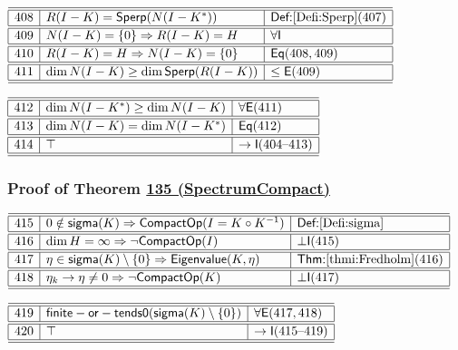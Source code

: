 \documentclass[11pt,reqno]{amsart}
\begin{document}
\medskip

\noindent$%
\begin{array}{|r|l|l|}
\hline\hline
408 & R(I-K)=\mathsf{Sperp}(N(I-K^{*})) & \textsf{Def:}\ref{Defi:Sperp}(407) \\ \hline\hline
409 & N(I-K)=\{0\}\Rightarrow R(I-K)=H & \forall\mathsf{I} \\ \hline\hline
410 & R(I-K)=H\Rightarrow N(I-K)=\{0\} & \mathsf{Eq}(408,409) \\ \hline\hline
411 & \dim N(I-K)\ge\dim\mathsf{Sperp}(R(I-K)) & \le\mathsf{E}(409) \\ \hline\hline
\end{array}%
$

\medskip

\noindent$%
\begin{array}{|r|l|l|}
\hline\hline
412 & \dim N(I-K^{*})\ge\dim N(I-K) & \forall\mathsf{E}(411) \\ \hline\hline
413 & \dim N(I-K)=\dim N(I-K^{*}) & \mathsf{Eq}(412) \\ \hline\hline
414 & \top & \to\mathsf{I}(404\text{--}413) \\ \hline\hline
\end{array}%
$

\medskip

\subsubsection*{Proof of Theorem \hyperlink{thm:SpectrumCompact}{135 (\textsf{SpectrumCompact})}}

\noindent$%
\begin{array}{|r|l|l|}
\hline\hline
415 & 0\notin\mathsf{sigma}(K)\Rightarrow\mathsf{CompactOp}(I=K\circ K^{-1}) & \textsf{Def:}\ref{Defi:sigma} \\ \hline\hline
416 & \dim H=\infty\Rightarrow\neg\mathsf{CompactOp}(I) & \bot\mathsf{I}(415) \\ \hline\hline
417 & \eta\in\mathsf{sigma}(K)\setminus\{0\}\Rightarrow\mathsf{Eigenvalue}(K,\eta) & \textsf{Thm:}\ref{thmi:Fredholm}(416) \\ \hline\hline
418 & \eta_{k}\to\eta\neq0\Rightarrow\neg\mathsf{CompactOp}(K) & \bot\mathsf{I}(417) \\ \hline\hline
\end{array}%
$

\medskip

\noindent$%
\begin{array}{|r|l|l|}
\hline\hline
419 & \mathsf{finite-or-tends0}(\mathsf{sigma}(K)\setminus\{0\}) & \forall\mathsf{E}(417,418) \\ \hline\hline
420 & \top & \to\mathsf{I}(415\text{--}419) \\ \hline\hline
\end{array}%
$
\end{document}

